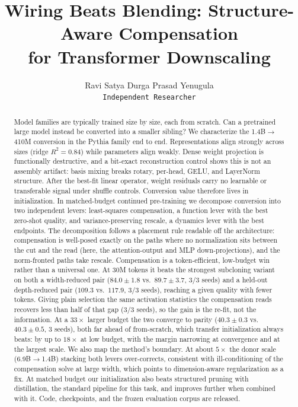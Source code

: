 \documentclass{article}
\title{Wiring Beats Blending: Structure-Aware Compensation\\for Transformer Downscaling}
\author{Ravi Satya Durga Prasad Yenugula\\
\texttt{Independent Researcher}}
\begin{document}
\maketitle

\begin{abstract}
Model families are typically trained size by size, each from scratch. Can a
pretrained large model instead be converted into a smaller sibling? We characterize the 1.4B$\to$410M conversion
in the Pythia family end to end. Representations align strongly across sizes
(ridge $R^2=0.84$) while parameters align weakly. Dense weight projection is
functionally destructive, and a bit-exact reconstruction control shows this is
not an assembly artifact: basis mixing breaks rotary, per-head, GELU, and
LayerNorm structure. After the best-fit linear operator, weight residuals carry
no learnable or transferable signal under shuffle controls. Conversion
value therefore lives in initialization. In matched-budget continued
pre-training we decompose conversion into two independent levers: least-squares
compensation, a function lever with the best zero-shot quality, and
variance-preserving rescale, a dynamics lever with the best endpoints. The
decomposition follows a placement rule readable off the architecture:
compensation is well-posed exactly on the paths where no normalization sits
between the cut and the read (here, the attention-output and MLP
down-projections), and the norm-fronted paths take rescale.
Compensation is a token-efficient, low-budget win rather than a universal one. At
30M tokens it beats the strongest subcloning variant on both a width-reduced pair
($84.0\pm1.8$ vs.\ $89.7\pm3.7$, 3/3 seeds) and a held-out depth-reduced pair
($109.3$ vs.\ $117.9$, 3/3 seeds), reaching a given quality with fewer tokens.
Giving plain selection the same activation statistics the compensation reads
recovers less than half of that gap (3/3 seeds), so the gain is the re-fit, not
the information. At a $33\times$ larger budget the two converge to parity
($40.3\pm0.3$ vs.\ $40.3\pm0.5$, 3 seeds), both far ahead of from-scratch, which transfer initialization always beats: by up to
$18\times$ at low budget, with the margin narrowing at convergence and at the
largest scale. We also map the method's boundary. At about $5\times$ the donor
scale (6.9B$\to$1.4B) stacking both levers over-corrects, consistent with
ill-conditioning of the compensation solve at large width, which points to
dimension-aware regularization as a fix. At matched budget our initialization
also beats structured pruning with distillation, the standard pipeline for this
task, and improves further when combined with it. Code, checkpoints, and the
frozen evaluation corpus are released.
\end{abstract}
\end{document}
